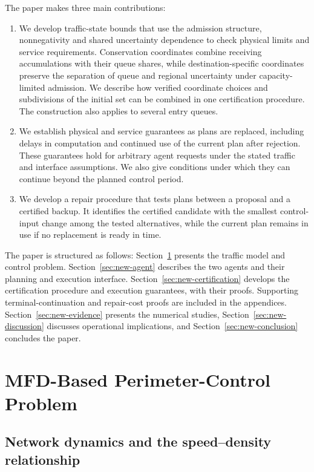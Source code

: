 \documentclass[preprint,12pt]{elsarticle}
\theoremstyle{definition}
\theoremstyle{plain}
\theoremstyle{definition}
\theoremstyle{plain}
\begin{document}
The paper makes three main contributions:
\begin{enumerate}
\item We develop traffic-state bounds that use the admission structure,
nonnegativity and shared uncertainty dependence to check physical limits
and service requirements. Conservation coordinates combine receiving
accumulations with their queue shares, while destination-specific coordinates
preserve the separation of queue and regional uncertainty under
capacity-limited admission. We describe how verified coordinate choices
and subdivisions of the initial set can be combined in one certification
procedure. The construction also applies to several entry queues.

\item We establish physical and service guarantees as plans are replaced,
including delays in computation and continued use of the current plan
after rejection. These guarantees hold for arbitrary agent requests under
the stated traffic and interface assumptions. We also give conditions
under which they can continue beyond the planned control period.

\item We develop a repair procedure that tests plans between a proposal
and a certified backup. It identifies the certified candidate with the
smallest control-input change among the tested alternatives, while the
current plan remains in use if no replacement is ready in time.
\end{enumerate}

The paper is structured as follows:
Section~\ref{sec:new-problem} presents the traffic model and control
problem. Section~\ref{sec:new-agent} describes the two agents and their
planning and execution interface. Section~\ref{sec:new-certification} develops the
certification procedure and execution guarantees, with their proofs.
Supporting terminal-continuation and repair-cost proofs are included in
the appendices.
Section~\ref{sec:new-evidence} presents the numerical studies,
Section~\ref{sec:new-discussion} discusses operational implications, and
Section~\ref{sec:new-conclusion} concludes the paper.

\section{MFD-Based Perimeter-Control Problem}
\label{sec:new-problem}

\subsection{Network dynamics and the speed--density relationship}
\label{app:new-model}
\end{document}
